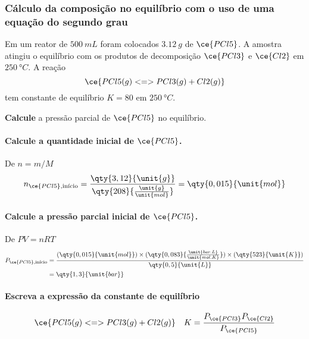 \begin{example}

\subsubsection{Cálculo da composição no equilíbrio com o uso de uma equação do segundo grau}

Em um reator de \(\qty{500}{\unit{mL}}\) foram colocados \(\qty{3,12}{\unit{g}}\) de \(\ce{PCl5}\). A amostra atingiu o equilíbrio com os produtos de
decomposição \(\ce{PCl3}\) e \(\ce{Cl2}\) em \(\qty{250}{\unit{\degree C}}\). A reação \[
    \ce{ PCl5(g) <=> PCl3(g) + Cl2(g) }
\] tem constante de equilíbrio \(K = \num{80}\) em \(\qty{250}{\unit{\degree C}}\).

\textbf{Calcule} a pressão parcial de \(\ce{PCl5}\) no equilíbrio.

\paragraph{\texorpdfstring{Calcule a quantidade inicial de \(\ce{PCl5}\).}{Calcule a quantidade inicial de \textbackslash ce\{PCl5\}.}}

De \(n = m/M\) \[
    n_{\ce{PCl5}, \text{início}} 
        = \dfrac{ \qty{3,12}{\unit{g}} }{ \qty{208}{\tfrac{\unit{g}}{\unit{mol}}} } 
        = \qty{0,015}{\unit{mol}}
\]

\paragraph{\texorpdfstring{Calcule a pressão parcial inicial de \(\ce{PCl5}\).}{Calcule a pressão parcial inicial de \textbackslash ce\{PCl5\}.}}

De \(PV = nRT\) \[
\begin{aligned}
    P_{\ce{PCl5}, \text{início}} 
        &= \dfrac{ (\qty{0,015}{\unit{mol}}) 
            \times (\qty{0,083}{\tfrac{\unit{bar.L}}{\unit{mol.K}}}) 
            \times (\qty{523}{\unit{K}}) }{ \qty{0,5}{\unit{L}} } \\
        &= \qty{1,3}{\unit{bar}}
\end{aligned}
\]

\paragraph{Escreva a expressão da constante de equilíbrio}

\[
    \ce{ PCl5(g) <=> PCl3(g) + Cl2(g) } 
        \quad K = \dfrac{ P_{\ce{PCl3}} P_{\ce{Cl2}} }{ P_{\ce{PCl5}} }
\]


\end{example}
